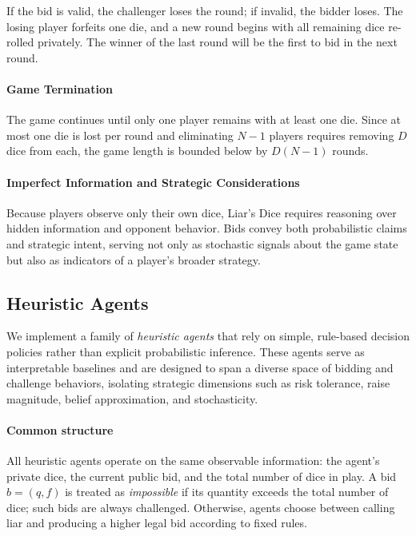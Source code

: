 If the bid is valid, the challenger loses the round; if invalid, the bidder loses. The losing player forfeits one die, and a new round begins with all remaining dice re-rolled privately. The winner of the last round will be the first to bid in the next round.

\paragraph{\textbf{Game Termination}}

The game continues until only one player remains with at least one die. Since at most one die is lost per round and eliminating \(N-1\) players requires removing \(D\) dice from each, the game length is bounded below by \(D (N-1)\) rounds.

\paragraph{\textbf{Imperfect Information and Strategic Considerations}}

Because players observe only their own dice, Liar’s Dice requires reasoning over hidden information and opponent behavior. Bids convey both probabilistic claims and strategic intent, serving not only as stochastic signals about the game state but also as indicators of a player’s broader strategy.



\subsection{\textbf{Heuristic Agents}}
\label{app:heuristic_agents}

We implement a family of \emph{heuristic agents} that rely on simple, rule-based decision policies rather than explicit probabilistic inference. These agents serve as interpretable baselines and are designed to span a diverse space of bidding and challenge behaviors, isolating strategic dimensions such as risk tolerance, raise magnitude, belief approximation, and stochasticity.

\paragraph{\textbf{Common structure}}
All heuristic agents operate on the same observable information: the agent’s private dice, the current public bid, and the total number of dice in play. A bid \( b = (q,f) \) is treated as \emph{impossible} if its quantity exceeds the total number of dice; such bids are always challenged. Otherwise, agents choose between calling liar and producing a higher legal bid according to fixed rules.


